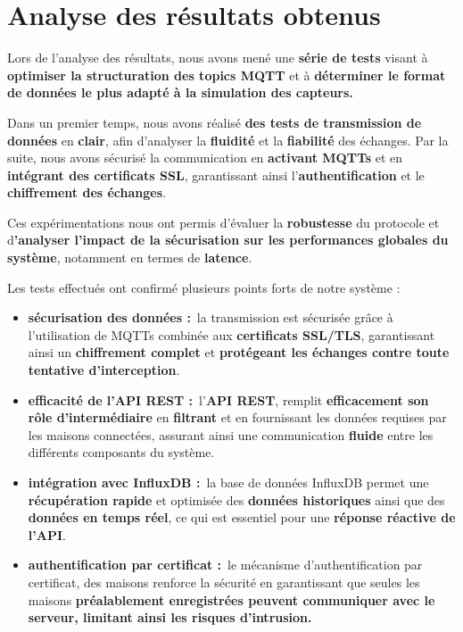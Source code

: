 \documentclass[10pt, a4paper]{report}
\begin{document}
	\section{Analyse des résultats obtenus}
	
	Lors de l’analyse des résultats, nous avons mené une\textbf{ série de tests} visant à \textbf{optimiser la structuration des topics MQTT} et à \textbf{déterminer le format de données le plus adapté à la simulation des capteurs.}
	
	Dans un premier temps, nous avons réalisé \textbf{des tests de transmission de données} en \textbf{clair}, afin d’analyser la \textbf{fluidité} et la \textbf{fiabilité} des échanges. Par la suite, nous avons sécurisé la communication en \textbf{activant MQTTs} et en \textbf{intégrant des certificats SSL}, garantissant ainsi l’\textbf{authentification} et le \textbf{chiffrement des échanges}.
	
	Ces expérimentations nous ont permis d’évaluer la \textbf{robustesse} du protocole et d\textbf{’analyser l'impact de la sécurisation sur les performances globales du système}, notamment en termes de \textbf{latence}.
	
	Les tests effectués ont confirmé plusieurs points forts de notre système : 
	\begin{itemize}
		\item  \textbf{sécurisation des données :} la transmission est sécurisée grâce à l'utilisation de MQTTs combinée aux \textbf{certificats SSL/TLS}, garantissant ainsi un \textbf{chiffrement complet} et \textbf{protégeant les échanges contre toute tentative d'interception}.  
		\item  \textbf{efficacité de l’API REST :} l’\textbf{API REST}, remplit \textbf{efficacement son rôle d'intermédiaire} en \textbf{filtrant} et en fournissant les données requises par les maisons connectées, assurant ainsi une communication \textbf{fluide} entre les différents composants du système.  
		\item  \textbf{intégration avec InfluxDB :} la base de données InfluxDB permet une \textbf{récupération rapide} et optimisée des \textbf{données historiques} ainsi que des\textbf{ données en temps réel}, ce qui est essentiel pour une \textbf{réponse réactive de l'API}.  
		\item  \textbf{authentification par certificat :} le mécanisme d'authentification par certificat, des maisons renforce la sécurité en garantissant que seules les maisons \textbf{préalablement enregistrées peuvent communiquer avec le serveur, limitant ainsi les risques d'intrusion.}
	\end{itemize} 
\end{document}
